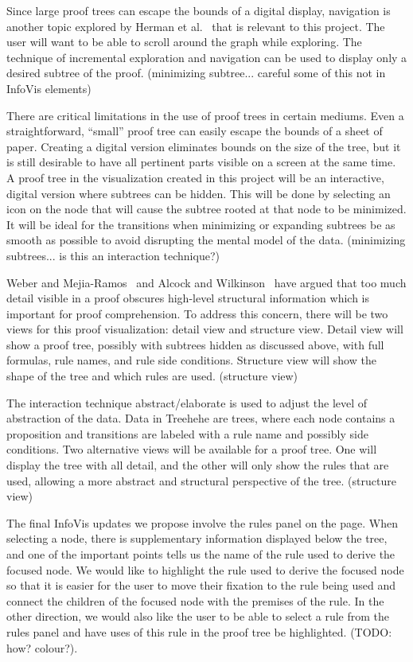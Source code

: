 \documentclass[conference]{IEEEtran}
\newcommand{\projectname}{Treehehe}
\begin{document}
Since large proof trees can escape the bounds of a digital display, navigation is another topic explored by Herman et al.~\cite{graphvis-herman+melancon+marshall} that is relevant to this project. The user will want to be able to scroll around the graph while exploring. The technique of incremental exploration and navigation can be used to display only a desired subtree of the proof. (minimizing subtree... careful some of this not in InfoVis elements)

There are critical limitations in the use of proof trees in certain mediums. Even a straightforward, ``small'' proof tree can easily escape the bounds of a sheet of paper. Creating a digital version eliminates bounds on the size of the tree, but it is still desirable to have all pertinent parts visible on a screen at the same time. A proof tree in the visualization created in this project will be an interactive, digital version where subtrees can be hidden. This will be done by selecting an icon on the node that will cause the subtree rooted at that node to be minimized. It will be ideal for the transitions when minimizing or expanding subtrees be as smooth as possible to avoid disrupting the mental model of the data. (minimizing subtrees... is this an interaction technique?)



Weber and Mejia-Ramos~\cite{majorsbeliefs-weber+mejiaramos} and Alcock and Wilkinson~\cite{eproofs-alcock+wilkinson} have argued that too much detail visible in a proof obscures high-level structural information which is important for proof comprehension. To address this concern, there will be two views for this proof visualization: detail view and structure view. Detail view will show a proof tree, possibly with subtrees hidden as discussed above, with full formulas, rule names, and rule side conditions. Structure view will show the shape of the tree and which rules are used. (structure view)

The interaction technique abstract/elaborate is used to adjust the level of abstraction of the data. Data in \projectname{} are trees, where each node contains a proposition and transitions are labeled with a rule name and possibly side conditions. Two alternative views will be available for a proof tree. One will display the tree with all detail, and the other will only show the rules that are used, allowing a more abstract and structural perspective of the tree. (structure view)

The final InfoVis updates we propose involve the rules panel on the page. When selecting a node, there is supplementary information displayed below the tree, and one of the important points tells us the name of the rule used to derive the focused node. We would like to highlight the rule used to derive the focused node so that it is easier for the user to move their fixation to the rule being used and connect the children of the focused node with the premises of the rule. In the other direction, we would also like the user to be able to select a rule from the rules panel and have uses of this rule in the proof tree be highlighted. (TODO: how? colour?).
\end{document}
